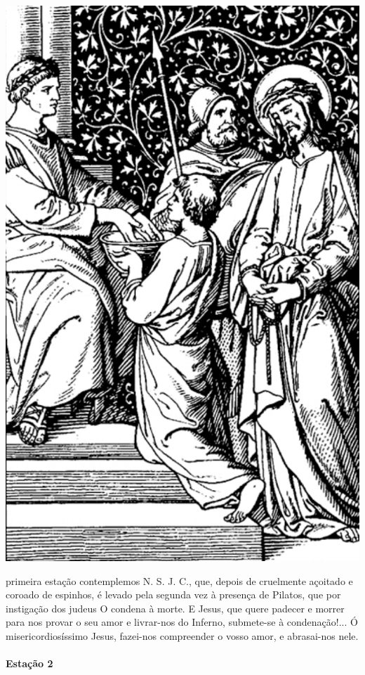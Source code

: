 \begin{nscenter}
\includegraphics[width=.8\textwidth, height=.8\textheight, keepaspectratio]{media/station1}
\end{nscenter}

 primeira estação contemplemos N. S. J. C., que, depois de cruelmente açoitado e coroado de espinhos, é levado pela segunda vez à presença de Pilatos, que por instigação dos judeus O condena à morte.
E Jesus, que quere padecer e morrer para nos provar o seu amor e livrar-nos do Inferno, submete-se à condenação!...
Ó misericordiosíssimo Jesus, fazei-nos compreender o vosso amor, e abrasai-nos nele.

\pagebreak

\paragraph{Estação 2}

